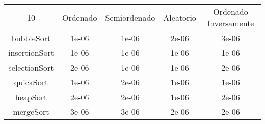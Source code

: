 \begin{longtable}{c | c | c | c | c}
10 & Ordenado & Semiordenado & Aleatorio & Ordenado Inversamente \\
bubbleSort & 1e-06 & 1e-06 & 2e-06 & 3e-06 \\
insertionSort & 1e-06 & 1e-06 & 1e-06 & 1e-06 \\
selectionSort & 2e-06 & 1e-06 & 1e-06 & 2e-06 \\
quickSort & 1e-06 & 2e-06 & 1e-06 & 1e-06 \\
heapSort & 2e-06 & 2e-06 & 1e-06 & 2e-06 \\
mergeSort & 3e-06 & 3e-06 & 2e-06 & 2e-06 \\
\end{longtable}